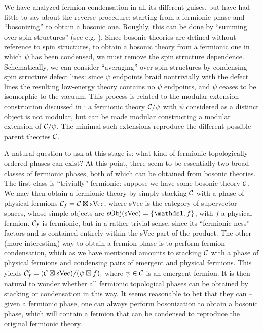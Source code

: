 We have analyzed fermion condensation in all its different guises, but have had little to say about the reverse procedure:
starting from a fermionic phase and ``bosonizing'' to obtain a bosonic one. Roughly, this can be done by 
``summing over spin structures'' (see e.g. \cite{bhardwaj2016,kapustin2017}).
Since bosonic theories are defined without reference to spin structures, to obtain a bosonic theory from a fermionic 
one in which $\psi$ has been condensed, we must remove the spin structure dependence. 
Schematically, we can consider ``averaging'' over spin structures by condensing spin structure defect lines: since $\psi$ endpoints braid nontrivially with the defect lines the resulting low-energy theory contains no 
$\psi$ endpoints, and $\psi$ ceases to be isomorphic to the vacuum. 
This process is related to the modular extension construction discussed in \cite{Lan2016b}: a fermionic theory $\mathcal{C} /\psi$ with $\psi$ considered as a distinct object is not modular, but can be made modular
constructing a modular extension of $\mathcal{C} / \psi$. The minimal such extensions reproduce the different possible 
parent theories $\mathcal{C}$. 

A natural question to ask at this stage is: what kind of fermionic topologically ordered phases can exist? 
At this point, there seem to be essentially two broad classes of fermionic phases, both of which can be obtained from bosonic theories. 
The first class is ``trivially'' fermionic: suppose we have some bosonic theory $\mathcal{C}$. 
We may then obtain a fermionic theory by simply stacking $\mathcal{C}$ with a phase of physical fermions $\mathcal{C}_{f} = \mathcal{C} \boxtimes {\rm sVec}$, where sVec is the category of supervector spaces, whose simple objects are ${\rm sObj}({\rm sVec}) = \{\unit,f\}$, with $f$ a physical fermion. 
$\mathcal{C}_f$ is fermionic, but in a rather trivial sense, since its ``fermionic-ness'' factors and is contained entirely within the sVec part of the product. 
The other (more interesting) way to obtain a fermion phase is to perform fermion condensation, which as we have 
mentioned amounts to stacking $\mathcal{C}$ with a phase of physical fermions and condensing pairs of emergent and physical fermions. 
This yields $\mathcal{C}_f' = (\mathcal{C} \boxtimes {\rm sVec}) / (\psi \boxtimes f),$
where $\psi \in \mathcal{C}$ is an emergent fermion. 
It is then natural to wonder whether all fermionic topological phases can be obtained by stacking or condensation in this way. 
It seems reasonable to bet that they can -- given a fermionic phase, one can always perform bosonization 
to obtain a bosonic phase, which will contain a fermion that can be condensed to reproduce the 
original fermionic theory. 

